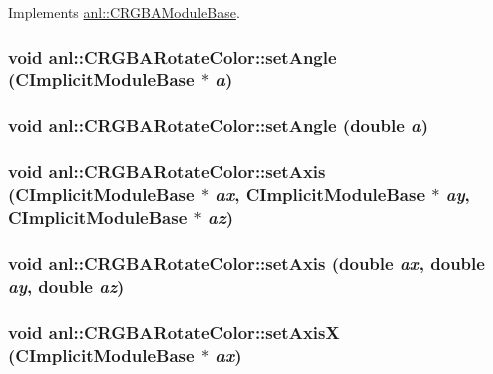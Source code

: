 Implements \hyperlink{classanl_1_1CRGBAModuleBase_afb6896d38ae92b9bb784fe5dc731ae67}{anl::CRGBAModuleBase}.\hypertarget{classanl_1_1CRGBARotateColor_a3dc2409b024ee22e1e8e9c71b24200ba}{
\subsubsection[{setAngle}]{\setlength{\rightskip}{0pt plus 5cm}void anl::CRGBARotateColor::setAngle ({\bf CImplicitModuleBase} $\ast$ {\em a})}}
\label{classanl_1_1CRGBARotateColor_a3dc2409b024ee22e1e8e9c71b24200ba}
\hypertarget{classanl_1_1CRGBARotateColor_ac3338cc2827f77b17a286effcb2cba8d}{
\subsubsection[{setAngle}]{\setlength{\rightskip}{0pt plus 5cm}void anl::CRGBARotateColor::setAngle (double {\em a})}}
\label{classanl_1_1CRGBARotateColor_ac3338cc2827f77b17a286effcb2cba8d}
\hypertarget{classanl_1_1CRGBARotateColor_a9d129d41d67afc21ff1e426eeb5a6987}{
\subsubsection[{setAxis}]{\setlength{\rightskip}{0pt plus 5cm}void anl::CRGBARotateColor::setAxis ({\bf CImplicitModuleBase} $\ast$ {\em ax}, \/  {\bf CImplicitModuleBase} $\ast$ {\em ay}, \/  {\bf CImplicitModuleBase} $\ast$ {\em az})}}
\label{classanl_1_1CRGBARotateColor_a9d129d41d67afc21ff1e426eeb5a6987}
\hypertarget{classanl_1_1CRGBARotateColor_a148eb4893227f4d831e792eb46777c23}{
\subsubsection[{setAxis}]{\setlength{\rightskip}{0pt plus 5cm}void anl::CRGBARotateColor::setAxis (double {\em ax}, \/  double {\em ay}, \/  double {\em az})}}
\label{classanl_1_1CRGBARotateColor_a148eb4893227f4d831e792eb46777c23}
\hypertarget{classanl_1_1CRGBARotateColor_a95761cf5c645d05e3351a0e71a215dbb}{
\subsubsection[{setAxisX}]{\setlength{\rightskip}{0pt plus 5cm}void anl::CRGBARotateColor::setAxisX ({\bf CImplicitModuleBase} $\ast$ {\em ax})}}
